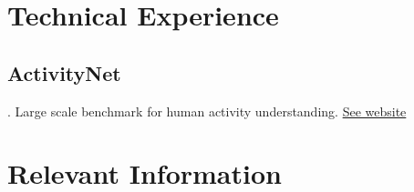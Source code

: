 \documentclass[letterpaper,10pt]{article}
\begin{document}
\section{Technical Experience}
\subsection{ActivityNet}. Large scale benchmark for human activity understanding. 
\href{http://activity-net.org/}{See website}






\section{Relevant Information}
\end{document}
